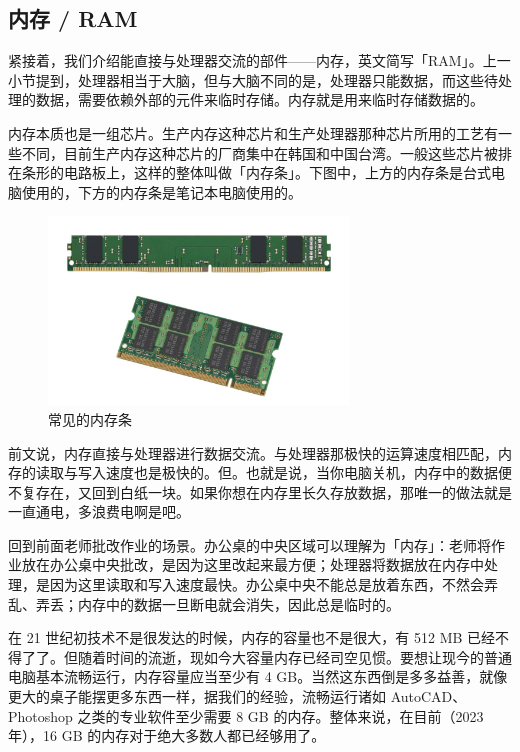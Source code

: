 \subsection{内存 / RAM}

紧接着，我们介绍能直接与处理器交流的部件——内存，英文简写「RAM」。上一小节提到，处理器相当于大脑，但与大脑不同的是，处理器只能数据，而这些待处理的数据，需要依赖外部的元件来临时存储。内存就是用来临时存储数据的。

内存本质也是一组芯片。生产内存这种芯片和生产处理器那种芯片所用的工艺有一些不同，目前生产内存这种芯片的厂商集中在韩国和中国台湾。一般这些芯片被排在条形的电路板上，这样的整体叫做「内存条」。下图中，上方的内存条是台式电脑使用的，下方的内存条是笔记本电脑使用的。

\begin{figure}[H]
  \centering
  \includegraphics[width=8cm]{assets/RAMs.jpg}
  \caption{常见的内存条}
  \label{rams}
\end{figure}

前文说，内存直接与处理器进行数据交流。与处理器那极快的运算速度相匹配，内存的读取与写入速度也是极快的。但。也就是说，当你电脑关机，内存中的数据便不复存在，又回到白纸一块。如果你想在内存里长久存放数据，那唯一的做法就是一直通电，多浪费电啊是吧。

回到前面老师批改作业的场景。办公桌的中央区域可以理解为「内存」：老师将作业放在办公桌中央批改，是因为这里改起来最方便；处理器将数据放在内存中处理，是因为这里读取和写入速度最快。办公桌中央不能总是放着东西，不然会弄乱、弄丢；内存中的数据一旦断电就会消失，因此总是临时的。

在 21 世纪初技术不是很发达的时候，内存的容量也不是很大，有 512 MB 已经不得了了。但随着时间的流逝，现如今大容量内存已经司空见惯。要想让现今的普通电脑基本流畅运行，内存容量应当至少有 4 GB。当然这东西倒是多多益善，就像更大的桌子能摆更多东西一样，据我们的经验，流畅运行诸如 AutoCAD、Photoshop 之类的专业软件至少需要 8 GB 的内存。整体来说，在目前（2023 年），16 GB 的内存对于绝大多数人都已经够用了。

